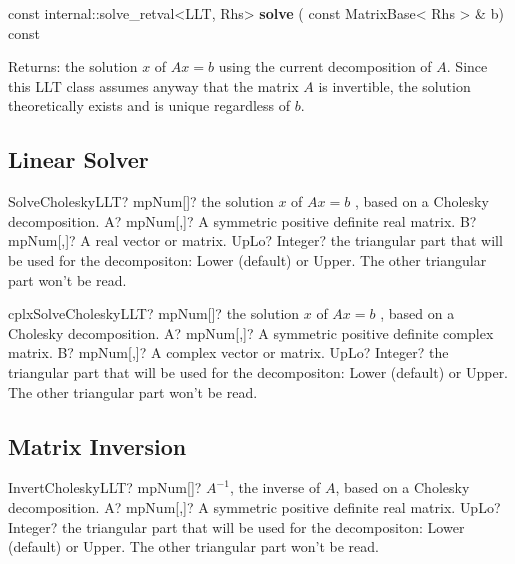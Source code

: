 \vspace{0.3cm}
const internal::solve\_retval<LLT, Rhs> \textbf{solve}  ( const MatrixBase< Rhs > \&  b)  const 

Returns: the solution $x$ of $A x = b$ using the current decomposition of $A$.
Since this LLT class assumes anyway that the matrix $A$ is invertible, the solution theoretically exists and is unique regardless of $b$.



\subsection{Linear Solver}

\begin{mpFunctionsExtract}
	\mpFunctionThree
	{SolveCholeskyLLT? mpNum[]? the solution $x$ of $A x = b$ , based on a Cholesky decomposition.}
	{A? mpNum[,]? A symmetric positive definite real matrix.}
	{B? mpNum[,]? A real vector or matrix.}
	{UpLo? Integer? the triangular part that will be used for the decompositon: Lower (default) or Upper. The other triangular part won't be read.}
\end{mpFunctionsExtract}

\vspace{0.6cm}
\begin{mpFunctionsExtract}
	\mpFunctionThree
	{cplxSolveCholeskyLLT? mpNum[]? the solution $x$ of $A x = b$ , based on a Cholesky decomposition.}
	{A? mpNum[,]? A symmetric positive definite complex matrix.}
	{B? mpNum[,]? A complex vector or matrix.}
	{UpLo? Integer? the triangular part that will be used for the decompositon: Lower (default) or Upper. The other triangular part won't be read.}
\end{mpFunctionsExtract}






\subsection{Matrix Inversion}

\begin{mpFunctionsExtract}
	\mpFunctionTwo
	{InvertCholeskyLLT? mpNum[]? $A^{-1}$, the inverse of $A$, based on a Cholesky decomposition.}
	{A? mpNum[,]? A symmetric positive definite real matrix.}
	{UpLo? Integer? the triangular part that will be used for the decompositon: Lower (default) or Upper. The other triangular part won't be read.}
\end{mpFunctionsExtract}


